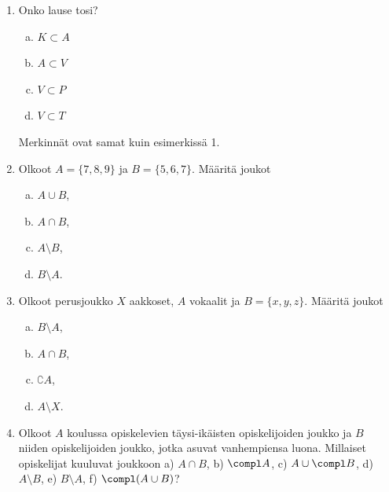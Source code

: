 
\Harjoitustehtavat

\begin{enumerate}

\item Onko lause tosi?
\begin{enumerate}[a)]
\item $K \subset A$
\item $A \subset V$
\item $V \subset P$
\item $V \subset T$
\end{enumerate}
Merkinnät ovat samat kuin esimerkissä 1.

\item Olkoot $A = \{7, 8, 9\}$ ja $B=\{5, 6, 7\}$. Määritä joukot
\begin{enumerate}[a)]
\item $A \cup B$,
\item $A \cap B$,
\item $A \setminus B$,
\item $B \setminus A$.
\end{enumerate}

\item Olkoot perusjoukko $X$ aakkoset, $A$ vokaalit ja $B=\{x, y, z\}$.
Määritä joukot
\begin{enumerate}[a)]
\item $B\setminus A$,
\item $A\cap B$,
\item $\complement A$,
\item $A \setminus X$.
\end{enumerate}


\item
Olkoot $A$ koulussa opiskelevien täysi-ikäisten opiskelijoiden joukko ja $B$ niiden opiskelijoiden joukko, jotka asuvat vanhempiensa luona. Millaiset opiskelijat kuuluvat joukkoon a) $A \cap B$,  b) $\compl A$, c) $A \cup \compl B$, d) $A\setminus B$, e) $B \setminus A$, f) $\compl (A \cup B)$?


\end{enumerate}
